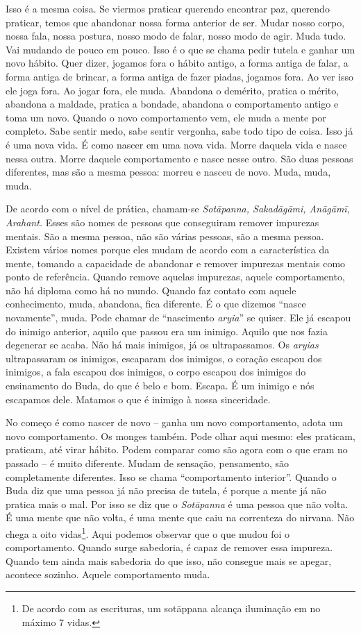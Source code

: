 Isso é a mesma coisa. Se viermos praticar querendo encontrar paz,
querendo praticar, temos que abandonar nossa forma anterior de ser.
Mudar nosso corpo, nossa fala, nossa postura, nosso modo de falar,
nosso modo de agir. Muda tudo. Vai mudando de pouco em pouco. Isso é o
que se chama pedir tutela e ganhar um novo hábito. Quer dizer, jogamos
fora o hábito antigo, a forma antiga de falar, a forma antiga de
brincar, a forma antiga de fazer piadas, jogamos fora. Ao ver isso ele
joga fora. Ao jogar fora, ele muda. Abandona o demérito, pratica o
mérito, abandona a maldade, pratica a bondade, abandona o comportamento
antigo e toma um novo. Quando o novo comportamento vem, ele muda a
mente por completo. Sabe sentir medo, sabe sentir vergonha, sabe todo
tipo de coisa. Isso já é uma nova vida. É como nascer em uma nova vida.
Morre daquela vida e nasce nessa outra. Morre daquele comportamento e
nasce nesse outro. São duas pessoas diferentes, mas são a mesma pessoa:
morreu e nasceu de novo. Muda, muda, muda. 

De acordo com o nível de prática, chamam-se \textit{Sot\=apanna,
Sakad\=ag\=ami, An\=ag\=amī, Arahant.} Esses são nomes de pessoas
que conseguiram remover impurezas mentais. São a mesma pessoa, não são
várias pessoas, são a mesma pessoa. Existem vários nomes porque eles
mudam de acordo com a característica da mente, tomando a capacidade de
abandonar e remover impurezas mentais como ponto de referência. Quando
remove aquelas impurezas, aquele comportamento, não há diploma como há
no mundo. Quando faz contato com aquele conhecimento, muda, abandona,
fica diferente. É o que dizemos “nasce novamente”, muda. Pode chamar de
“nascimento \textit{aryia}” se quiser. Ele já escapou do inimigo
anterior, aquilo que passou era um inimigo. Aquilo que nos fazia
degenerar se acaba. Não há mais inimigos, já os ultrapassamos. Os
\textit{aryias} ultrapassaram os inimigos, escaparam dos inimigos, o
coração escapou dos inimigos, a fala escapou dos inimigos, o corpo
escapou dos inimigos do ensinamento do Buda, do que é belo e bom.
Escapa. É um inimigo e nós escapamos dele. Matamos o que é inimigo à
nossa sinceridade. 

No começo é como nascer de novo – ganha um novo comportamento, adota
um novo comportamento. Os monges também. Pode olhar aqui mesmo: eles
praticam, praticam, até virar hábito. Podem comparar como são agora com
o que eram no passado – é muito diferente. Mudam de sensação,
pensamento, são completamente diferentes. Isso se chama “comportamento
interior”. Quando o Buda diz que uma pessoa já não precisa de tutela, é
porque a mente já não pratica mais o mal. Por isso se diz que o
\textit{Sot\=apanna} é uma pessoa que não volta. É uma mente que não
volta, é uma mente que caiu na correnteza do nirvana. Não chega a oito
vidas\footnote{De acordo com as escrituras, um sot\=appana alcança
iluminação em no máximo 7 vidas.}. Aqui podemos observar que o que
mudou foi o comportamento. Quando surge sabedoria, é capaz de remover
essa impureza. Quando tem ainda mais sabedoria do que isso, não
consegue mais se apegar, acontece sozinho. Aquele comportamento muda. 

